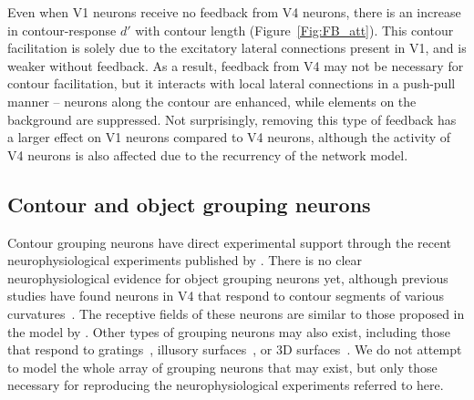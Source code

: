
Even when V1 neurons receive no feedback from V4 neurons, there is an increase in contour-response $d'$ with contour length (Figure~\ref{Fig:FB_att}). This contour facilitation is solely due to the excitatory lateral connections present in V1, and is weaker without feedback. As a result, feedback from V4  may not be necessary for contour facilitation, but it interacts with local lateral connections
in a push-pull manner -- neurons along the contour are enhanced, while
elements on the background are suppressed. Not surprisingly, removing
this type of feedback has a larger effect on V1 neurons compared to V4 neurons, although the activity of V4 neurons is also affected due to the
recurrency of the network model.

\subsection{Contour and object grouping neurons}
Contour grouping neurons have direct experimental support through the recent neurophysiological experiments published by \cite{Chen_etal14}. There is no clear neurophysiological evidence for object grouping neurons yet, although previous studies have found neurons in V4 that respond to contour segments of various curvatures~\citep{Pasupathy_Connor02,Brincat_Connor04}. The receptive fields of these neurons are similar to those proposed in the model by
\cite{Craft_etal07}. Other types of grouping neurons may also exist,
including those that respond to gratings~\citep{Hegde_vanEssen07}, illusory surfaces~\citep{Cox_etal13}, or 3D surfaces~\citep{He_Nakayama95,Hu_etal15a}. We do not attempt to model the whole array of grouping neurons that may exist, but only those necessary for reproducing the neurophysiological experiments referred to here. 

